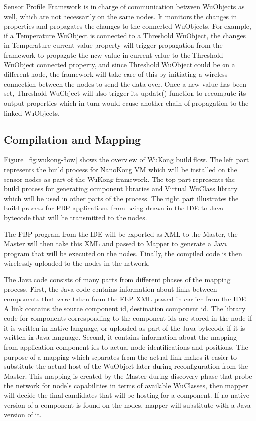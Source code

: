 Sensor Profile Framework is in charge of communication between WuObjects as
well, which are not necessarily on the same nodes. It monitors
the changes in properties and propagates the changes to the connected WuObjects.
For example, if a Temperature WuObject is connected to a Threshold WuObject,
the changes in Temperature current value property will trigger propagation from
the framework to propagate the new value in current value to the
Threshold WuObject connected property, and since Threshold WuObject could be on
a different node, the framework will take care of this by initiating
a wireless connection between the nodes to send the data over. Once a new value
has been set, Threshold WuObject will also trigger its update() function to
recompute its output properties which in turn would cause another chain of
propagation to the linked WuObjects.

\subsection{Compilation and Mapping}

Figure~\ref{fig:wukong-flow} shows the overview of WuKong build flow. The
left part represents the build process for NanoKong VM which will be installed
on the sensor nodes as part of the WuKong framework. The top part represents
the build process for generating component libraries and Virtual WuClass
library which will be used in other parts of the process. The right part
illustrates the build process for FBP applications from being drawn in the IDE
to Java bytecode that will be transmitted to the nodes.

The FBP program from the IDE will be exported as XML to the Master, the Master
will then take this XML and passed to Mapper to generate a Java program that
will be executed on the nodes. Finally, the compiled code is then wirelessly
uploaded to the nodes in the network.

The Java code consists of many parts from different phases of the mapping process.
First, the Java code contains information about links between components that
were taken from the FBP XML passed in earlier from the IDE. A link contains the
source component id, destination component id. The library code for components
corresponding to the component ids are stored in the node if it is written in
native language, or uploaded as part of the Java bytecode if it is written in
Java language. Second, it contains information about the mapping from
application component ids to actual node identifications and positions. The
purpose of a mapping which separates from the actual link makes it easier to
substitute the actual host of the WuObject later during
reconfiguration from the Master. This mapping is created by the Master during
discovery phase that probe the network for node's capabilities in terms of
available WuClasses, then mapper will decide the final candidates that will be
hosting for a component. If no native version of a component is found on the
nodes, mapper will substitute with a Java version of it.

